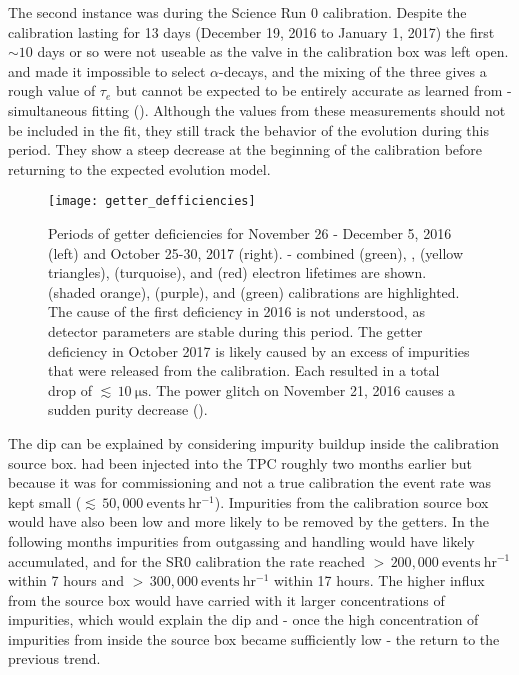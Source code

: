 The second instance was during the Science Run 0  calibration.  Despite the calibration lasting for 13 days
(December 19, 2016 to January 1, 2017) the first ${\sim} 10$ days or
so were not useable as the valve in the calibration box  was left
open.   and  made it impossible to select  $\alpha$-decays, and the mixing of the three gives a
rough
value of $\tau_e$ but cannot be expected to be entirely accurate as learned from \rnbkg- simultaneous fitting
().  Although the values from these measurements should not be included in the
fit, they still track the behavior of the evolution during this period.  They show a steep decrease at the beginning of the calibration
before returning to the expected evolution model.

\begin{figure}
\centering
\texttt{[image: getter\_defficiencies]}
\caption[Periods of getter deficiencies for November 26 - December 5, 2016 and October 25-30, 2017.]{Periods of getter deficiencies for
November 26 - December 5, 2016 (left) and October 25-30, 2017 (right).  - combined (green), ,
(yellow triangles),  (turquoise), and  (red) electron lifetimes are shown.  \metakr (shaded orange),
 (purple), and \ambe (green) calibrations are highlighted.  The cause of the first deficiency in 2016 is not understood, as
detector parameters are stable during this period.  The getter deficiency in October 2017 is likely caused by an excess of impurities
that were released from the  calibration.  Each resulted in a total drop of ${\lesssim}\, 10\ \mathrm{\mu s}$.  The power
glitch on November 21, 2016 causes a sudden purity decrease ().}
\label{fig:electron_lifetime_model_detector_effects_getter_getter_deficiencies}
\end{figure}

The dip can be explained by considering impurity buildup inside the calibration source box.   had been injected into the TPC
roughly two months earlier but because it was for commissioning and not a true calibration the event rate was kept small
(${\lesssim}\, 50,000\ \mathrm{events\ hr^{-1}}$).  Impurities from the calibration source box would have also been low and more likely to be
removed by the getters.  In the following months
impurities from outgassing and handling would have likely accumulated, and for the SR0 calibration the rate reached
${>}\, 200,000\ \mathrm{events\ hr^{-1}}$ within 7 hours and ${>}\, 300,000\ \mathrm{events\ hr^{-1}}$ within 17 hours.  The higher influx
from the source box would have carried with it larger concentrations of impurities, which would explain the
dip and - once the high concentration of impurities from inside the source box became sufficiently low - the return to the previous
trend.

